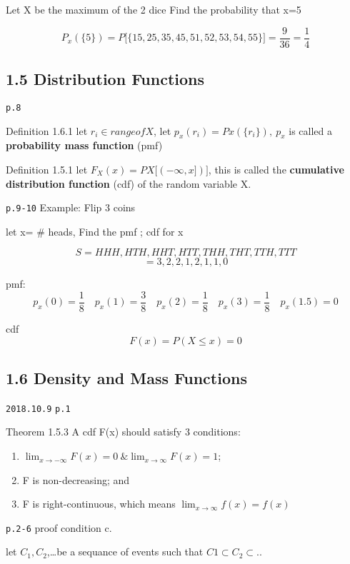 \documentclass[]{tufte-book}
\providecommand{\tightlist}{%
  \setlength{\itemsep}{0pt}\setlength{\parskip}{0pt}}
\begin{document}
Let X be the maximum of the 2 dice Find the probability that x=5

\[P_x(\{5\})=P\big[\{15,25,35,45,51,52,53,54,55\}\big]=\frac9{36}=\frac14\]

\hypertarget{distribution-functions}{%
\subsection{1.5 Distribution Functions}\label{distribution-functions}}

\texttt{p.8}

Definition 1.6.1 let \(r_i\in range of X\), let
\(p_x(r_i)=Px(\{r_i\}),\ p_x\) is called a \textbf{probability mass
function} (pmf)

Definition 1.5.1 let \(F_X(x)=PX\big[(-\infty,x])\big]\), this is called
the \textbf{cumulative distribution function} (cdf) of the random
variable X.

\texttt{p.9-10} Example: Flip 3 coins

let x= \# heads, Find the pmf ; cdf for x

\[S={HHH, HTH, HHT, HTT, THH, THT, TTH, TTT}\]
\[ ={3,   2,   2,   1,   2,   1,   1,   0}\]

pmf:
\[p_x(0)=\frac18\quad p_x(1)=\frac38\quad p_x(2)=\frac18\quad p_x(3)=\frac18\quad p_x(1.5)=0\]

cdf \[F(x)=P(X\le x)=0\]

\hypertarget{density-and-mass-functions}{%
\subsection{1.6 Density and Mass
Functions}\label{density-and-mass-functions}}

\texttt{2018.10.9} \texttt{p.1}

Theorem 1.5.3 A cdf F(x) should satisfy 3 conditions:

\begin{enumerate}
\def\labelenumi{\alph{enumi}.}
\tightlist
\item
  \(\lim_{x\to-\infty}F(x)=0\ \& \lim_{x\to\infty}F(x)=1\);\\
\item
  F is non-decreasing; and\\
\item
  F is right-continuous, which means \(\lim_{x\to\infty}f(x)=f(x)\)
\end{enumerate}

\texttt{p.2-6} proof condition c.

let \(C_1,C_2\),\ldots{}be a sequance of events such that
\(C1\subset C_2\subset..\)
\end{document}

